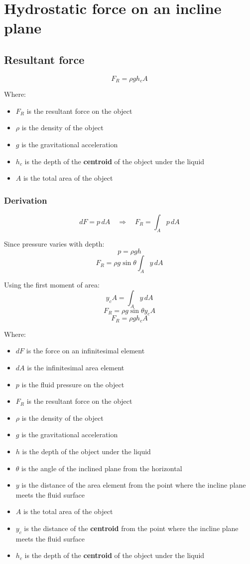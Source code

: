 \documentclass[11pt]{article}
\begin{document}
\newpage

\section{Hydrostatic force on an incline plane}
\label{sec:orgb337178}

\subsection{Resultant force}
\label{sec:orgefc6b3a}
\[F_R = \rho g h_c A\]

Where:
\begin{itemize}
\item \(F_R\) is the resultant force on the object
\item \(\rho\) is the density of the object
\item \(g\) is the gravitational acceleration
\item \(h_c\) is the depth of the \textbf{centroid} of the object under the liquid
\item \(A\) is the total area of the object
\end{itemize}

\newpage

\subsubsection{Derivation}
\label{sec:orga953db4}
\[dF = p \, dA \quad \Rightarrow \quad F_R = \int_A p \, dA\]

Since pressure varies with depth:
\[p = \rho g h\]
\[F_R = \rho g \sin \theta \int_A y \, dA\]

Using the first moment of area:
\[y_c A = \int_A y \, dA\]
\[F_R = \rho g \sin \theta y_c A\]
\[F_R = \rho g h_c A\]

Where:
\begin{itemize}
\item \(dF\) is the force on an infinitesimal element
\item \(dA\) is the infinitesimal area element
\item \(p\) is the fluid pressure on the object
\item \(F_R\) is the resultant force on the object
\item \(\rho\) is the density of the object
\item \(g\) is the gravitational acceleration
\item \(h\) is the depth of the object under the liquid
\item \(\theta\) is the angle of the inclined plane from the horizontal
\item \(y\) is the distance of the area element from the point where the incline plane meets the fluid surface
\item \(A\) is the total area of the object
\item \(y_c\) is the distance of the \textbf{centroid} from the point where the incline plane meets the fluid surface
\item \(h_c\) is the depth of the \textbf{centroid} of the object under the liquid
\end{itemize}
\end{document}
